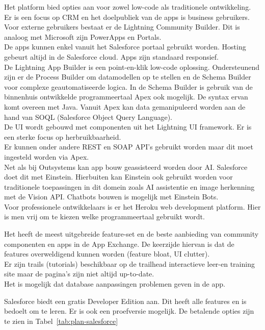Het platform bied opties aan voor zowel low-code als traditionele ontwikkeling.\\
Er is een focus op CRM en het doelpubliek van de apps is business gebruikers. Voor externe gebruikers bestaat er de Lightning Community Builder. Dit is analoog met Microsoft zijn PowerApps en Portals.\\
De apps kunnen enkel vanuit het Salesforce portaal gebruikt worden. Hosting gebeurt altijd in de Salesforce cloud. Apps zijn standaard responsief.\\
De Lightning App Builder is een point-en-klik low-code oplossing. Ondersteunend zijn er de Process Builder om datamodellen op te stellen en de Schema Builder voor complexe geautomatiseerde logica. In de Schema Builder is gebruik van de binnenhuis ontwikkelde programmeertaal Apex ook mogelijk. De syntax ervan komt overeen met Java. Vanuit Apex kan data gemanipuleerd worden aan de hand van SOQL (Salesforce Object Query Language).\\
De UI wordt gebouwd met componenten uit het Lightning UI framework. Er is een sterke focus op herbruikbaarheid.\\
Er kunnen onder andere REST en SOAP API's gebruikt worden maar dit moet ingesteld worden via Apex.\\
Net als bij Outsystems kan app bouw geassisteerd worden door AI. Salesforce doet dit met Einstein. Hierbuiten kan Einstein ook gebruikt worden voor traditionele toepassingen in dit domein zoals AI assistentie en image herkenning met de Vision API. Chatbots bouwen is mogelijk met Einstein Bots.\\
Voor professionele ontwikkelaars is er het Heroku web development platform. Hier is men vrij om te kiezen welke programmeertaal gebruikt wordt.

Het heeft de meest uitgebreide feature-set en de beste aanbieding van community componenten en apps in de App Exchange. De keerzijde hiervan is dat de features overweldigend kunnen worden (feature bloat, UI clutter).\\
Er zijn trails (tutorials) beschikbaar op de trailhead interactieve leer-en training site maar de pagina's zijn niet altijd up-to-date.\\
Het is mogelijk dat database aanpassingen problemen geven in de app.
\autocite{Marvin2017b}

Salesforce biedt een gratis Developer Edition aan. Dit heeft alle features en is bedoelt om te leren. Er is ook een proefversie mogelijk. De betalende opties zijn te zien in Tabel~\ref{tab:plan-salesforce}

